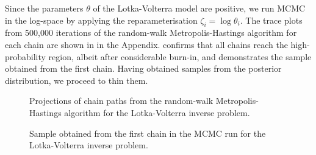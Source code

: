\documentclass[11pt,a4paper]{report}
\begin{document}
Since the parameters $\theta$ of the Lotka-Volterra model are positive, we run MCMC in the log-space by applying the reparameterisation $\zeta_i = \log \theta_i$. The trace plots from 500,000 iterations of the random-walk Metropolis-Hastings algorithm for each chain are shown in  in the Appendix.  confirms that all chains reach the high-probability region, albeit after considerable burn-in, and  demonstrates the sample obtained from the first chain. Having obtained samples from the posterior distribution, we proceed to thin them.

\begin{figure}[h]
\centering
{}
\caption{Projections of chain paths from the random-walk Metropolis-Hastings algorithm for the Lotka-Volterra inverse problem.
\label{fig:lotka-volterra:chain-paths}}
\end{figure}

\begin{figure}[h]
\centering
{}
\caption{Sample obtained from the first chain in the MCMC run for the Lotka-Volterra inverse problem.
\label{fig:lotka-volterra:chain1-sample}}
\end{figure}
\end{document}
